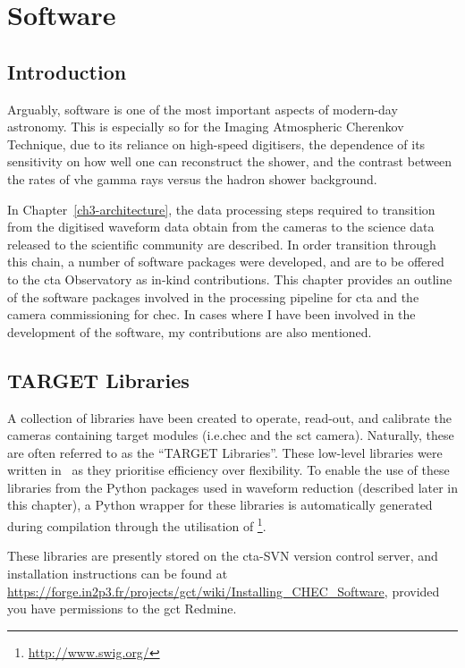 \chapter{\label{ch4-software}Software} 

\minitoc

\section{Introduction}

Arguably, software is one of the most important aspects of modern-day astronomy. This is especially so for the Imaging Atmospheric Cherenkov Technique, due to its reliance on high-speed digitisers, the dependence of its sensitivity on how well one can reconstruct the shower, and the contrast between the rates of \gls{vhe} gamma rays versus the hadron shower background.

In Chapter~\ref{ch3-architecture}, the data processing steps required to transition from the digitised waveform data obtain from the cameras to the science data released to the scientific community are described. In order transition through this chain, a number of software packages were developed, and are to be offered to the \gls{cta} Observatory as in-kind contributions. This chapter provides an outline of the software packages involved in the processing pipeline for \gls{cta} and the camera commissioning for \gls{chec}. In cases where I have been involved in the development of the software, my contributions are also mentioned.

\section{TARGET Libraries}

A collection of libraries have been created to operate, read-out, and calibrate the cameras containing \gls{target} modules (i.e.\@ \gls{chec} and the \gls{sct} camera). Naturally, these are often referred to as the ``TARGET Libraries''. These low-level libraries were written in \cpp~as  they prioritise efficiency over flexibility. To enable the use of these libraries from the Python packages used in waveform reduction (described later in this chapter), a Python wrapper for these libraries is automatically generated during compilation through the utilisation of \footnote{\url{http://www.swig.org/}}.

These libraries are presently stored on the \gls{cta}-SVN version control server, and installation instructions can be found at \url{https://forge.in2p3.fr/projects/gct/wiki/Installing_CHEC_Software}, provided you have permissions to the \gls{gct} Redmine.

